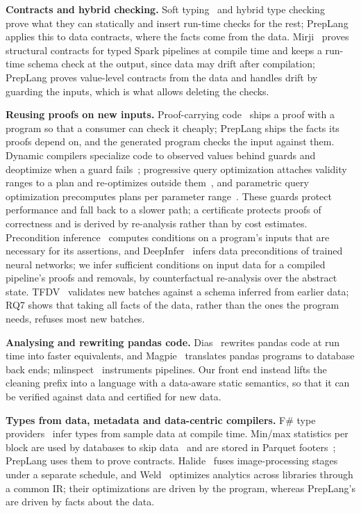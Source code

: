 \documentclass[conference]{IEEEtran}
\begin{document}
\textbf{Contracts and hybrid checking.} Soft typing~\cite{cartwright1991} and hybrid type
checking~\cite{flanagan2006} prove what they can statically and insert run-time checks for the rest;
PrepLang applies this to data contracts, where the facts come from the data. Mirji~\cite{mirji2026}
proves structural contracts for typed Spark pipelines at compile time and keeps a run-time schema
check at the output, since data may drift after compilation; PrepLang proves value-level contracts
from the data and handles drift by guarding the inputs, which is what allows deleting the checks.

\textbf{Reusing proofs on new inputs.} Proof-carrying code~\cite{necula1997} ships a proof with a
program so that a consumer can check it cheaply; PrepLang ships the facts its proofs depend on, and
the generated program checks the input against them. Dynamic compilers specialize code to observed
values behind guards and deoptimize when a guard fails~\cite{holzle1992}; progressive query
optimization attaches validity ranges to a plan and re-optimizes outside them~\cite{markl2004},
and parametric query optimization precomputes plans per parameter range~\cite{ioannidis1992}.
These guards protect performance and fall back to a slower path; a certificate protects proofs of
correctness and is derived by re-analysis rather than by cost estimates. Precondition
inference~\cite{cousot2013} computes conditions on a program's inputs that are necessary for its
assertions, and DeepInfer~\cite{ahmed2024} infers data preconditions of trained neural networks;
we infer sufficient conditions on input data for a compiled pipeline's proofs and removals, by
counterfactual re-analysis over the abstract state. TFDV~\cite{breck2019} validates new batches
against a schema inferred from earlier data; RQ7 shows that taking all facts of the data, rather
than the ones the program needs, refuses most new batches.

\textbf{Analysing and rewriting pandas code.} Dias~\cite{baziotis2024} rewrites pandas code
at run time into faster equivalents, and Magpie~\cite{jindal2021} translates pandas programs to
database back ends; mlinspect~\cite{grafberger2022} instruments pipelines. Our front end instead
lifts the cleaning prefix into a language with a data-aware static semantics, so that it can be
verified against data and certified for new data.

\textbf{Types from data, metadata and data-centric compilers.} F\# type
providers~\cite{petricek2016} infer types from sample data at compile time. Min/max statistics per
block are used by databases to skip data~\cite{moerkotte1998} and are stored in Parquet
footers~\cite{parquet}; PrepLang uses them to prove contracts. Halide~\cite{ragan2013} fuses
image-processing stages under a separate schedule, and Weld~\cite{palkar2017} optimizes analytics
across libraries through a common IR; their optimizations are driven by the program, whereas
PrepLang's are driven by facts about the data.
\end{document}
